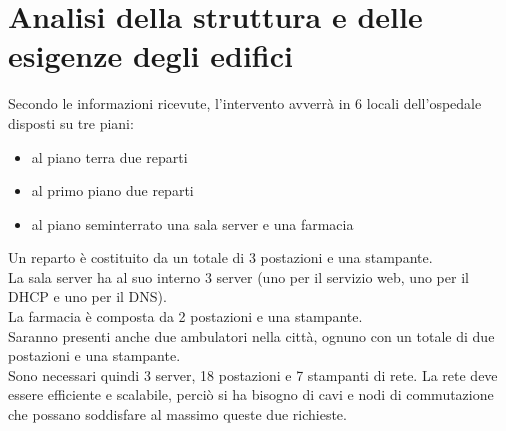 \section{Analisi della struttura e delle esigenze degli edifici}

Secondo le informazioni ricevute, l'intervento avverrà in 6 locali dell'ospedale disposti su tre piani:
\begin{itemize}
	\item al piano terra due reparti
	\item al primo piano due reparti
	\item al piano seminterrato una sala server e una farmacia
\end{itemize}
Un reparto è costituito da un totale di 3 postazioni e una stampante.\\
La sala server ha al suo interno 3 server (uno per il servizio web, uno per il DHCP e uno per il DNS).\\
La farmacia è composta da 2 postazioni e una stampante.\\
Saranno presenti anche due ambulatori nella città, ognuno con un totale di due postazioni e una stampante. \\
Sono necessari quindi 3 server, 18 postazioni e 7 stampanti di rete.
La rete deve essere efficiente e scalabile, perciò si ha bisogno di cavi e nodi di commutazione che possano soddisfare al massimo queste due richieste.